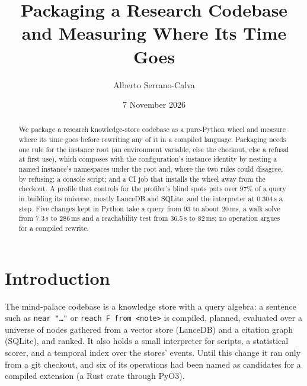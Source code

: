 \documentclass[11pt]{article}
\title{Packaging a Research Codebase and Measuring Where Its Time Goes}
\author{Alberto Serrano-Calva}
\date{7 November 2026}
\theoremstyle{plain}
\theoremstyle{definition}
\theoremstyle{remark}
\begin{document}
\maketitle

\begin{abstract}
We package a research knowledge-store codebase as a pure-Python wheel and measure where its time
goes before rewriting any of it in a compiled language. Packaging needs one rule for the instance
root (an environment variable, else the checkout, else a refusal at first use), which composes with
the configuration's instance identity by nesting a named instance's namespaces under the root and,
where the two rules could disagree, by refusing; a console script; and a CI job that installs the
wheel away from the checkout. A profile that controls for the
profiler's blind spots puts over 97\% of a query in building its universe, mostly LanceDB and
SQLite, and the interpreter at 0.304\,\textmu s a step. Five changes kept in Python take a query
from 93 to about 20\,ms, a walk solve from 7.3\,s to 286\,ms and a reachability test from 36.5\,s to
82\,ms; no operation argues for a compiled rewrite.
\end{abstract}

\section{Introduction}

The mind-palace codebase is a knowledge store with a query algebra: a sentence such as
\texttt{near "\dots"} or \texttt{reach F from <note>} is compiled, planned, evaluated over a
universe of nodes gathered from a vector store (LanceDB) and a citation graph (SQLite), and ranked.
It also holds a small interpreter for scripts, a statistical scorer, and a temporal index over the
stores' events. Until this change it ran only from a git checkout, and six of its operations had
been named as candidates for a compiled extension (a Rust crate through PyO3).
\end{document}
